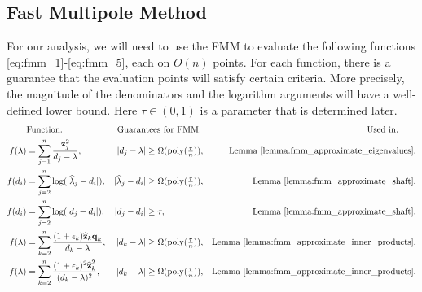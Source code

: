 \documentclass{article}
\DeclareMathOperator{\poly}{poly}
\newcommand\vecq{\boldsymbol{\mathrm{q}}}
\newcommand\vecz{\boldsymbol{\mathrm{z}}}
\newcommand\veczhat{\widehat{\boldsymbol{\mathrm{z}}}}
\begin{document}
\subsection{Fast Multipole Method}
\label{appendix:fast_multipole_method}
For our analysis, we will need to use the FMM to evaluate the following functions \eqref{eq:fmm_1}-\eqref{eq:fmm_5}, each on $O(n)$ points. 
For each function, there is a guarantee that the evaluation points will satisfy certain criteria. More precisely, the magnitude of the denominators and the logarithm arguments  will have a well-defined lower bound. Here $\tau\in(0,1)$ is a parameter that is determined later.
\begingroup
\allowdisplaybreaks
\begin{align}
    &\text{Function:}
    &
    \text{Guaran}&\text{tees for FMM:}
    & 
    \text{  Used in:}\qquad
    \nonumber
    \\
    f(\lambda)&=\sum_{j=1}^n\frac{\vecz_j^2}{d_j-\lambda},
    &
    |d_j-\lambda|&\geq \Omega(\poly(\tfrac{\tau}{n})),
    & \text{Lemma \ref{lemma:fmm_approximate_eigenvalues}},
    \label{eq:fmm_1}
    \\
    f(d_i)&=\sum_{j=2}^{n}\log(|\widehat\lambda_j-d_i|),
    &
    |\widehat\lambda_j-d_i|&\geq \Omega(\poly(\tfrac{\tau}{n})),
    & \text{Lemma \ref{lemma:fmm_approximate_shaft}},
    \label{eq:fmm_2}
    \\
    f(d_i)&=\sum_{j=2}^{n}\log(|d_{j}-d_i|),
    &
    |d_j-d_i|&\geq \tau,
    & \text{Lemma \ref{lemma:fmm_approximate_shaft}},
    \label{eq:fmm_3}
    \\
    f(\lambda)&=\sum_{k=2}^n\frac{(1+\epsilon_k)\veczhat_k\vecq_k}{d_k-\lambda},
    &
    |d_k-\lambda|&\geq \Omega(\poly(\tfrac{\tau}{n})),
    & \text{Lemma \ref{lemma:fmm_approximate_inner_products}},
    \label{eq:fmm_4}
    \\
    f(\lambda)&=\sum_{k=2}^n\frac{(1+\epsilon_k)^2\veczhat^2_k}{(d_k-\lambda)^2},
    &
    |d_k-\lambda|&\geq \Omega(\poly(\tfrac{\tau}{n})),
    & \text{Lemma \ref{lemma:fmm_approximate_inner_products}}.
    \label{eq:fmm_5}
\end{align}
\endgroup
\end{document}
